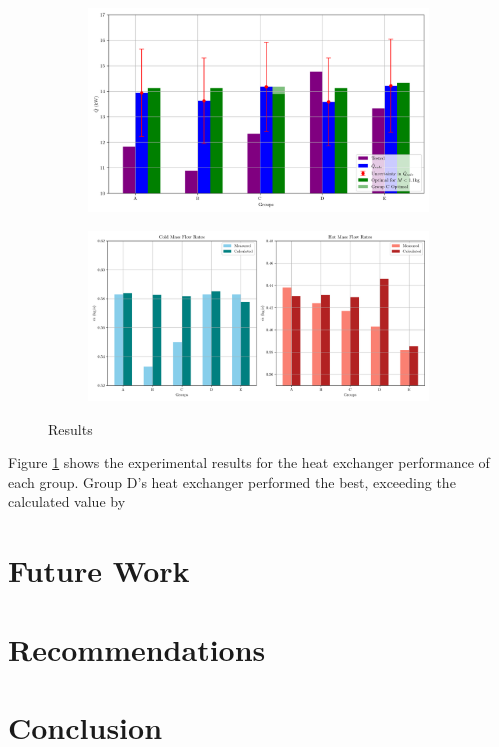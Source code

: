 \documentclass{article}
\begin{document}
\begin{figure}[H]
    \centering
    \begin{subfigure}{0.6\textwidth}
        \centering
        \includegraphics[width=0.99\textwidth]{2024_results.png}
        \label{fig:Qdot_results} 
    \end{subfigure}
    \begin{subfigure}{0.8\textwidth}
        \centering
        \includegraphics[width=0.99\textwidth]{2024_mass_flow_rates.png}
        \label{fig:mdot_results}
    \end{subfigure}
    \caption{Results}
\end{figure}

Figure \ref{fig:Qdot_results} shows the experimental results for the heat exchanger performance of each group.
Group D's heat exchanger performed the best, exceeding the calculated value by 

\newpage

\section{Future Work}


\section{Recommendations}
% 

\section{Conclusion}
\end{document}
